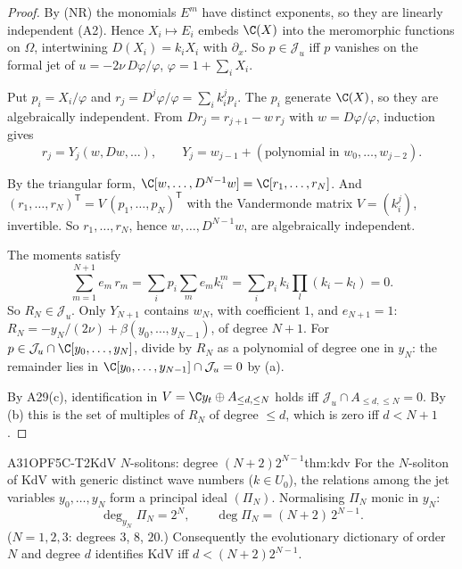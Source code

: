 \begin{proof}
By (NR) the monomials $E^m$ have distinct exponents, so they are linearly independent (A2). Hence $X_i\mapsto E_i$ embeds $\C(X)$ into the meromorphic functions on $\Omega$, intertwining $D(X_i)=k_iX_i$ with $\partial_x$. So $p\in\mathcal J_u$ iff $p$ vanishes on the formal jet of $u=-2\nu\,D\varphi/\varphi$, $\varphi=1+\sum_iX_i$.

Put $p_i=X_i/\varphi$ and $r_j=D^j\varphi/\varphi=\sum_ik_i^jp_i$. The $p_i$ generate $\C(X)$, so they are algebraically independent. From $Dr_j=r_{j+1}-w\,r_j$ with $w=D\varphi/\varphi$, induction gives
\[
r_j=Y_j(w,Dw,\dots),\qquad Y_j=w_{j-1}+(\text{polynomial in }w_0,\dots,w_{j-2}).
\]

By the triangular form, $\C[w,\dots,D^{N-1}w]=\C[r_1,\dots,r_N]$. And $(r_1,\dots,r_N)^{\mathsf T}=V\,(p_1,\dots,p_N)^{\mathsf T}$ with the Vandermonde matrix $V=(k_i^j)$, invertible. So $r_1,\dots,r_N$, hence $w,\dots,D^{N-1}w$, are algebraically independent.

The moments satisfy
\[
\sum_{m=1}^{N+1}e_m\,r_m=\sum_ip_i\sum_me_mk_i^m=\sum_ip_i\,k_i\prod_l(k_i-k_l)=0 .
\]
So $R_N\in\mathcal J_u$. Only $Y_{N+1}$ contains $w_N$, with coefficient $1$, and $e_{N+1}=1$: $R_N=-y_N/(2\nu)+\beta(y_0,\dots,y_{N-1})$, of degree $N+1$. For $p\in\mathcal J_u\cap\C[y_0,\dots,y_N]$, divide by $R_N$ as a polynomial of degree one in $y_N$: the remainder lies in $\C[y_0,\dots,y_{N-1}]\cap\mathcal J_u=0$ by (a).

By A29(c), identification in $V=\C y_t\oplus A_{\le d,\le N}$ holds iff $\mathcal J_u\cap A_{\le d,\le N}=0$. By (b) this is the set of multiples of $R_N$ of degree $\le d$, which is zero iff $d<N+1$.

\end{proof}

\begin{dimcard}{A31}{OPF5C-T2}{KdV $N$-solitons: degree $(N+2)2^{N-1}$}{}{thm:kdv}
\label{dim:S4ID-T3}%
For the $N$-soliton of KdV with generic distinct wave numbers ($k\in U_0$), the relations among the jet variables $y_0,\dots,y_N$ form a principal ideal $(\Pi_N)$. Normalising $\Pi_N$ monic in $y_N$:
\[
\deg_{y_N}\Pi_N=2^N,\qquad \deg\Pi_N=(N+2)\,2^{N-1}.
\]
($N=1,2,3$: degrees $3$, $8$, $20$.) Consequently the evolutionary dictionary of order $N$ and degree $d$ identifies KdV iff $d<(N+2)2^{N-1}$.
\end{dimcard}

